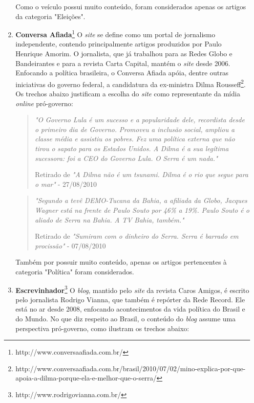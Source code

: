 \begin{enumerate}
Como o veículo possui muito conteúdo, foram considerados apenas os artigos da categoria "Eleições".  

\item \textbf{Conversa Afiada}\footnote{http://www.conversaafiada.com.br/} O \emph{site} se define como um portal de jornalismo independente, contendo principalmente artigos produzidos por Paulo Henrique Amorim. O jornalista, que já trabalhou para as Redes Globo e Bandeirantes e para a revista Carta Capital, mantém o \emph{site} desde 2006. Enfocando a política brasileira, o Conversa Afiada apóia, dentre outras iniciativas do governo federal, a candidatura da ex-ministra Dilma Rousseff\footnote{http://www.conversaafiada.com.br/brasil/2010/07/02/mino-explica-por-que-apoia-a-dilma-porque-ela-e-melhor-que-o-serra/}. Os trechos abaixo justificam a escolha do \emph{site} como representante da mídia \emph{online} pró-governo:

\begin{quote}

\emph{"O Governo Lula é um sucesso e a popularidade dele, recordista desde o primeiro dia de Governo. Promoveu a inclusão social, ampliou a classe média e assistiu os pobres. Fez uma política externa que não tirou o sapato para os Estados Unidos. A Dilma é a sua legítima sucessora: foi a CEO do Governo Lula. O Serra é um nada."}

{\small Retirado de \emph{"A Dilma não é um tsunami. Dilma é o rio que segue para o mar"} - 27/08/2010}
\end{quote}

\begin{quote}

\emph{"Segundo a tevê DEMO-Tucana da Bahia, a afiliada da Globo, Jacques Wagner está na frente de Paulo Souto por 46\% a 19\%. Paulo Souto é o aliado de Serra na Bahia. A TV Bahia, também."}

{\small Retirado de \emph{"Sumiram com o dinheiro do Serra. Serra é barrado em procissão"} - 07/08/2010}
\end{quote}


Também por possuir muito conteúdo, apenas os artigos pertencentes à categoria "Política" foram considerados.

\item \textbf{Escrevinhador}\footnote{http://www.rodrigovianna.com.br/} O \emph{blog}, mantido pelo \emph{site} da revista Caros Amigos, é escrito pelo jornalista Rodrigo Vianna, que também é repórter da Rede Record. Ele está no ar desde 2008, enfocando acontecimentos da vida política do Brasil e do Mundo. No que diz respeito ao Brasil, o conteúdo do \emph{blog} assume uma perspectiva pró-governo, como ilustram os trechos abaixo:


\end{enumerate}
